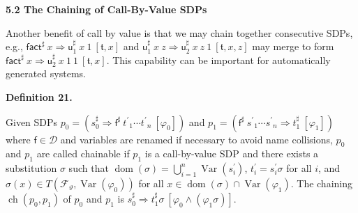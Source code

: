 \documentclass[10pt,a4paper]{amsart}
\begin{document}
 
 
\par\medskip\noindent\textbf{5.2 The Chaining of Call-By-Value SDPs}\par
 
 
Another benefit of call by value is that we may chain together consecutive SDPs, e.g., ${{\mathsf{fact}^{\sharp}}\ {x}}\Rightarrow{{{\mathsf{u}_{1}^{\sharp}}\ {x}}\ {1}}\ [\mathfrak{t},x]$ and ${{{\mathsf{u}_{1}^{\sharp}}\ {x}}\ {z}}\Rightarrow{{{{\mathsf{u}_{2}^{\sharp}}\ {x}}\ {z}}\ {1}}\ [\mathfrak{t},x,z]$ may merge to form ${{\mathsf{fact}^{\sharp}}\ {x}}\Rightarrow{{{{\mathsf{u}_{2}^{\sharp}}\ {x}}\ {1}}\ {1}}\ [\mathfrak{t},x]$. This capability can be important for automatically generated systems.\par
 
 
 
\par\medskip\noindent\textbf{Definition 21.}\par
 
 
Given SDPs $p_{0}=({s_{0}^{\sharp}}\Rightarrow{{\mathsf{f}^{\sharp}}\ {{t^{\prime}}_{1}\cdots{t^{\prime}}_{n}}}\ [\varphi_{0}])$ and $p_{1}=({{\mathsf{f}^{\sharp}}\ {{s^{\prime}}_{1}\cdots{s^{\prime}}_{n}}}\Rightarrow{t_{1}^{\sharp}}\ [\varphi_{1}])$ where $\mathsf{f}\in\mathcal{D}$ and variables are renamed if necessary to avoid name collisions, $p_{0}$ and $p_{1}$ are called chainable if $p_{1}$ is a call-by-value SDP and there exists a substitution $\sigma$ such that $\operatorname{dom}(\sigma)=\bigcup_{i=1}^{n}\operatorname{Var}(s_{i}^{\prime})$, $t_{i}^{\prime}=s_{i}^{\prime}\sigma$ for all $i$, and $\sigma(x)\in T({\mathcal{F}}_{\vartheta},\operatorname{Var}(\varphi_{0}))$ for all $x\in\operatorname{dom}(\sigma)\cap\operatorname{Var}(\varphi_{1})$. The chaining $\operatorname{ch}(p_{0},p_{1})$ of $p_{0}$ and $p_{1}$ is ${s_{0}^{\sharp}}\Rightarrow{t_{1}^{\sharp}\sigma}\ [\varphi_{0}\wedge(\varphi_{1}\sigma)]$.\par
 
 
 
 
\end{document}
